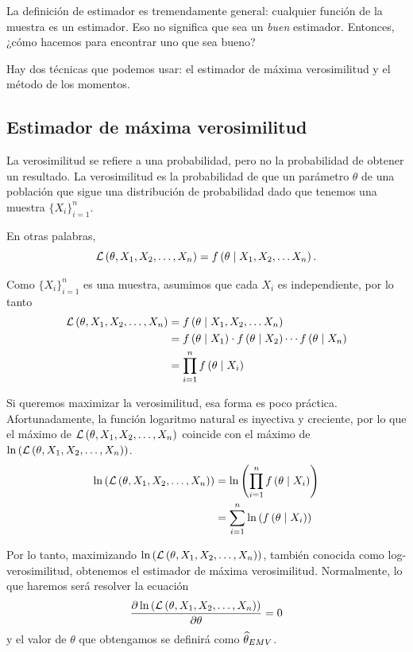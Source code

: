 La definición de estimador es tremendamente general: cualquier función de la muestra es un estimador. Eso no significa que sea un \emph{buen} estimador. Entonces, ¿cómo hacemos para encontrar uno que sea bueno?

Hay dos técnicas que podemos usar: el estimador de máxima verosimilitud y el método de los momentos. 

\subsection{Estimador de máxima verosimilitud}

La verosimilitud se refiere a una probabilidad, pero no la probabilidad de obtener un resultado. La verosimilitud es la probabilidad de que un parámetro \(\theta\) de una población que sigue una distribución de probabilidad dado que tenemos una muestra \(\{X_i\}_{i=1}^n\).

En otras palabras, \[\mathcal{L}\left(\theta, X_1, X_2, \ldots, X_n\right) = f\left(\theta\;\middle|\;X_1, X_2,\ldots X_n\right).\]

Como \(\{X_i\}_{i=1}^n\) es una muestra, asumimos que cada \(X_i\) es independiente, por lo tanto 
\begin{align*}
\mathcal{L}\left(\theta, X_1, X_2, \ldots, X_n\right) &= f\left(\theta\;\middle|\;X_1, X_2,\ldots X_n\right)\\
&= f\left(\theta\;\middle|\;X_1\right) \cdot f\left(\theta\;\middle|\;X_2\right) \cdots f\left(\theta\;\middle|\;X_n\right)\\
&= \prod_{i=1}^{n} f\left(\theta\;\middle|\;X_i\right)
\end{align*}

Si queremos maximizar la verosimilitud, esa forma es poco práctica. Afortunadamente, la función logaritmo natural es inyectiva y creciente, por lo que el máximo de \(\mathcal{L}\left(\theta, X_1, X_2, \ldots, X_n\right)\) coincide con el máximo de \(\ln\left( \mathcal{L}\left(\theta, X_1, X_2, \ldots, X_n\right) \right)\).
\begin{align*}
\ln\left( \mathcal{L}\left(\theta, X_1, X_2, \ldots, X_n\right) \right) &= \ln \left( \prod_{i=1}^{n} f\left(\theta\;\middle|\;X_i\right) \right)\\
&= \sum_{i=1}^{n} \ln\left( f\left(\theta\;\middle|\;X_i\right) \right)
\end{align*}

Por lo tanto, maximizando \(\ln\left( \mathcal{L}\left(\theta, X_1, X_2, \ldots, X_n\right) \right)\), también conocida como log-verosimilitud, obtenemos el estimador de máxima verosimilitud. Normalmente, lo que haremos será resolver la ecuación \[\frac{\partial \ln\left( \mathcal{L}\left(\theta, X_1, X_2, \ldots, X_n\right) \right)}{\partial \theta} = 0\] y el valor de \(\theta\) que obtengamos se definirá como \(\widehat{\theta}_{EMV}\).

